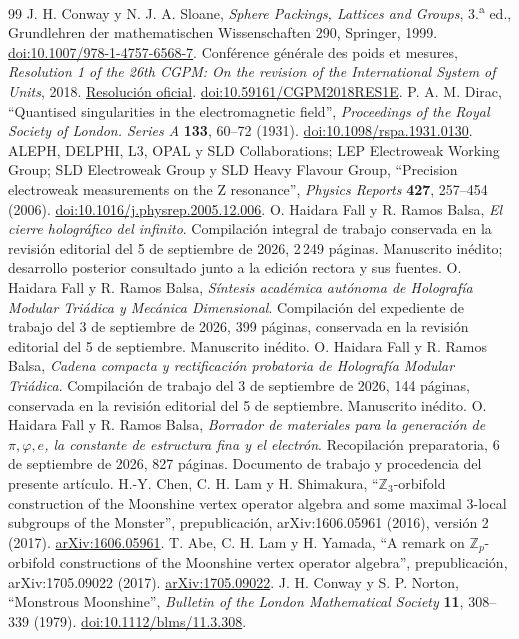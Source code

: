 \begin{thebibliography}{99}
 J. H. Conway y N. J. A. Sloane, \emph{Sphere Packings, Lattices and Groups}, 3.\textsuperscript{a} ed., Grundlehren der mathematischen Wissenschaften 290, Springer, 1999. \href{https://doi.org/10.1007/978-1-4757-6568-7}{doi:10.1007/978-1-4757-6568-7}.
 Conférence générale des poids et mesures, \emph{Resolution 1 of the 26th CGPM: On the revision of the International System of Units}, 2018. \href{https://www.bipm.org/en/committees/cg/cgpm/26-2018/resolution-1}{Resolución oficial}. \href{https://doi.org/10.59161/CGPM2018RES1E}{doi:10.59161/CGPM2018RES1E}.
 P. A. M. Dirac, ``Quantised singularities in the electromagnetic field'', \emph{Proceedings of the Royal Society of London. Series A} \textbf{133}, 60--72 (1931). \href{https://doi.org/10.1098/rspa.1931.0130}{doi:10.1098/rspa.1931.0130}.
 ALEPH, DELPHI, L3, OPAL y SLD Collaborations; LEP Electroweak Working Group; SLD Electroweak Group y SLD Heavy Flavour Group, ``Precision electroweak measurements on the Z resonance'', \emph{Physics Reports} \textbf{427}, 257--454 (2006). \href{https://doi.org/10.1016/j.physrep.2005.12.006}{doi:10.1016/j.physrep.2005.12.006}.
 O. Haidara Fall y R. Ramos Balsa, \emph{El cierre holográfico del infinito}. Compilación integral de trabajo conservada en la revisión editorial del 5 de septiembre de 2026, 2\,249 páginas. Manuscrito inédito; desarrollo posterior consultado junto a la edición rectora y sus fuentes.
 O. Haidara Fall y R. Ramos Balsa, \emph{Síntesis académica autónoma de Holografía Modular Triádica y Mecánica Dimensional}. Compilación del expediente de trabajo del 3 de septiembre de 2026, 399 páginas, conservada en la revisión editorial del 5 de septiembre. Manuscrito inédito.
 O. Haidara Fall y R. Ramos Balsa, \emph{Cadena compacta y rectificación probatoria de Holografía Modular Triádica}. Compilación de trabajo del 3 de septiembre de 2026, 144 páginas, conservada en la revisión editorial del 5 de septiembre. Manuscrito inédito.
 O. Haidara Fall y R. Ramos Balsa, \emph{Borrador de materiales para la generación de \(\pi,\varphi,e\), la constante de estructura fina y el electrón}. Recopilación preparatoria, 6 de septiembre de 2026, 827 páginas. Documento de trabajo y procedencia del presente artículo.
 H.-Y. Chen, C. H. Lam y H. Shimakura, ``\(\mathbb Z_3\)-orbifold construction of the Moonshine vertex operator algebra and some maximal \(3\)-local subgroups of the Monster'', prepublicación, arXiv:1606.05961 (2016), versión 2 (2017). \href{https://arxiv.org/abs/1606.05961}{arXiv:1606.05961}.
 T. Abe, C. H. Lam y H. Yamada, ``A remark on \(\mathbb Z_p\)-orbifold constructions of the Moonshine vertex operator algebra'', prepublicación, arXiv:1705.09022 (2017). \href{https://arxiv.org/abs/1705.09022}{arXiv:1705.09022}.
 J. H. Conway y S. P. Norton, ``Monstrous Moonshine'', \emph{Bulletin of the London Mathematical Society} \textbf{11}, 308--339 (1979). \href{https://doi.org/10.1112/blms/11.3.308}{doi:10.1112/blms/11.3.308}.
\end{thebibliography}
